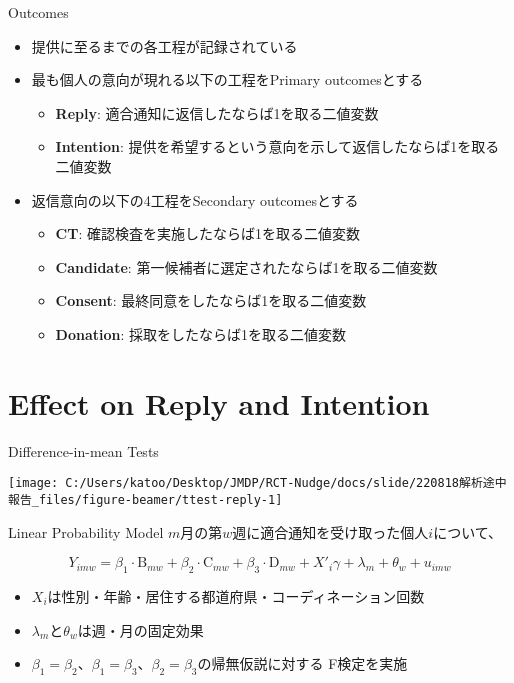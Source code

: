 \documentclass[
      aspectratio=169,
        12pt,
    ]{beamer}
\renewcommand{\textbf}[1]{{\color{DarkBlue}\bfseries#1}}
\providecommand{\tightlist}{%
  \setlength{\itemsep}{0pt}\setlength{\parskip}{0pt}}
\begin{document}
\begin{frame}{Outcomes}
\protect\hypertarget{outcomes}{}
\begin{itemize}
\tightlist
\item
  提供に至るまでの各工程が記録されている
\item
  最も個人の意向が現れる以下の工程をPrimary outcomesとする

  \begin{itemize}
  \tightlist
  \item
    \textbf{Reply}: 適合通知に返信したならば1を取る二値変数
  \item
    \textbf{Intention}: 提供を希望するという意向を示して返信したならば1を取る二値変数
  \end{itemize}
\item
  返信意向の以下の4工程をSecondary outcomesとする

  \begin{itemize}
  \tightlist
  \item
    \textbf{CT}: 確認検査を実施したならば1を取る二値変数
  \item
    \textbf{Candidate}: 第一候補者に選定されたならば1を取る二値変数
  \item
    \textbf{Consent}: 最終同意をしたならば1を取る二値変数
  \item
    \textbf{Donation}: 採取をしたならば1を取る二値変数
  \end{itemize}
\end{itemize}
\end{frame}

\hypertarget{effect-on-reply-and-intention}{%
\section{Effect on Reply and Intention}\label{effect-on-reply-and-intention}}

\begin{frame}{Difference-in-mean Tests}
\protect\hypertarget{difference-in-mean-tests}{}
\begin{center}\texttt{[image: C:/Users/katoo/Desktop/JMDP/RCT-Nudge/docs/slide/220818解析途中報告\_files/figure-beamer/ttest-reply-1]} \end{center}
\end{frame}

\begin{frame}{Linear Probability Model}
\protect\hypertarget{linear-probability-model}{}
\(m\)月の第\(w\)週に適合通知を受け取った個人\(i\)について、

\[
  Y_{imw} =
  \beta_1 \cdot \text{B}_{mw} + \beta_2 \cdot \text{C}_{mw}
  + \beta_3 \cdot \text{D}_{mw}
  + X'_i \gamma + \lambda_m + \theta_w + u_{imw}
\]

\begin{itemize}
\tightlist
\item
  \(X_i\)は性別・年齢・居住する都道府県・コーディネーション回数
\item
  \(\lambda_m\)と\(\theta_w\)は週・月の固定効果
\item
  \(\beta_1 = \beta_2\)、\(\beta_1 = \beta_3\)、\(\beta_2 = \beta_3\)の帰無仮説に対する
  F検定を実施
\end{itemize}
\end{frame}
\end{document}
